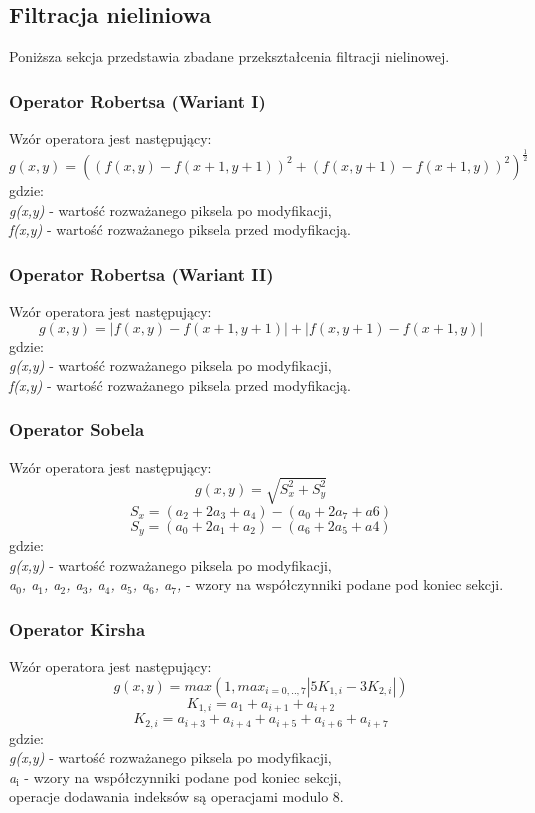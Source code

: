 \documentclass{classrep}
\begin{document}
\subsection{Filtracja nieliniowa}
Poniższa sekcja przedstawia zbadane przekształcenia filtracji nielinowej.

\subsubsection{Operator Robertsa (Wariant I)}
Wzór operatora jest następujący:
\[ g(x,y) = ((f(x,y) - f(x + 1, y + 1))^2 + (f(x,y + 1) - f(x + 1,y))^2)^\frac{1}{2} \]
gdzie:\\
\textit{g(x,y)} - wartość rozważanego piksela po modyfikacji,\\
\textit{f(x,y)} - wartość rozważanego piksela przed modyfikacją.

\subsubsection{Operator Robertsa (Wariant II)}
Wzór operatora jest następujący:
\[ g(x,y) = |f(x,y) - f(x + 1, y + 1)| + |f(x,y + 1) - f(x + 1,y)| \]
gdzie:\\
\textit{g(x,y)} - wartość rozważanego piksela po modyfikacji,\\
\textit{f(x,y)} - wartość rozważanego piksela przed modyfikacją.

\subsubsection{Operator Sobela}
Wzór operatora jest następujący:
\[ g(x,y) = \sqrt{S^2_x + S^2_y} \]
\[ S_x = (a_2 + 2a_3 + a_4) - (a_0 +2a_7 + a6) \]
\[ S_y = (a_0 + 2a_1 + a_2) - (a_6 +2a_5 + a4) \]
gdzie:\\
\textit{g(x,y)} - wartość rozważanego piksela po modyfikacji,\\
\textit{a$_{\text{0}}$, a$_{\text{1}}$, a$_{\text{2}}$, a$_{\text{3}}$, a$_{\text{4}}$, a$_{\text{5}}$, a$_{\text{6}}$, a$_{\text{7}}$,} - wzory na współczynniki podane pod koniec sekcji.

\subsubsection{Operator Kirsha}
Wzór operatora jest następujący:
\[ g(x,y) = max(1, max_{i=0,..,7}|5K_{1,i} - 3K_{2,i}|)\]
\[ K_{1,i} = a_1 + a_{i+1} + a_{i+2}\]
\[ K_{2,i} = a_{i+3} + a_{i+4} + a_{i+5} + a_{i+6} + a_{i+7}\]
gdzie:\\
\textit{g(x,y)} - wartość rozważanego piksela po modyfikacji,\\
\textit{a$_{\text{i}}$} - wzory na współczynniki podane pod koniec sekcji,\\
operacje dodawania indeksów są operacjami modulo 8.
\end{document}
